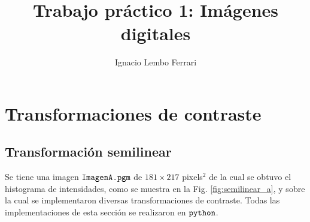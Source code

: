 \documentclass[letterpaper,12pt]{article}
\title{Trabajo práctico 1: Imágenes digitales} %
\author[1]{Ignacio Lembo Ferrari}
\affil[1]{Instituto Balseiro}
\date{\vspace{-4ex}}
\theoremstyle{plain}
\begin{document}
\maketitle
\section{Transformaciones de contraste \label{ej1}}

\subsection{Transformación semilinear}

Se tiene una imagen $\verb|ImagenA.pgm|$ de $181\times217$ pixels$^2$ de la cual se obtuvo el histograma de intensidades, como se muestra en la Fig. \ref{fig:semilinear_a}, y sobre la cual se implementaron diversas transformaciones de contraste. Todas las implementaciones de esta sección se realizaron en $\verb|python|$.
\end{document}
